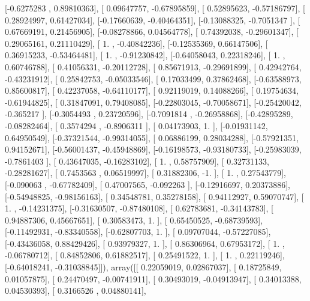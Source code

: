 \documentclass{article}
\begin{document}
       [-0.6275283 ,  0.89810363],
       [ 0.09647757, -0.67895859],
       [ 0.52895623, -0.57186797],
       [ 0.28924997,  0.61427034],
       [-0.17660639, -0.40464351],
       [-0.13088325, -0.7051347 ],
       [ 0.67669191,  0.21456905],
       [-0.08278866,  0.04564778],
       [ 0.74392038, -0.29601347],
       [ 0.29065161,  0.21110429],
       [ 1.        , -0.40842236],
       [-0.12535369,  0.66147506],
       [ 0.36915233, -0.53464481],
       [ 1.        , -0.91230842],
       [-0.64058043,  0.22318246],
       [ 1.        ,  0.60746788],
       [ 0.41056331, -0.20112728],
       [ 0.85671913, -0.29691899],
       [ 0.42942764, -0.43231912],
       [ 0.25842753, -0.05033546],
       [ 0.17033499,  0.37862468],
       [-0.63588973,  0.85600817],
       [ 0.42237058, -0.64110177],
       [ 0.92119019,  0.14088266],
       [ 0.19754634, -0.61944825],
       [ 0.31847091,  0.79408085],
       [-0.22803045, -0.70058671],
       [-0.25420042, -0.365217  ],
       [-0.3054493 ,  0.23720596],
       [-0.7091814 , -0.26958868],
       [-0.42895289, -0.08282464],
       [ 0.3574294 , -0.8906311 ],
       [ 0.04173903,  1.        ],
       [-0.01931142,  0.64950549],
       [-0.37321544, -0.99314055],
       [ 0.06886199,  0.28034288],
       [-0.57921351,  0.94152671],
       [-0.56001437, -0.45948869],
       [-0.16198573, -0.93180733],
       [-0.25983039, -0.7861403 ],
       [ 0.43647035, -0.16283102],
       [ 1.        ,  0.58757909],
       [ 0.32731133, -0.28281627],
       [ 0.7453563 ,  0.06519997],
       [ 0.31882306, -1.        ],
       [ 1.        ,  0.27543779],
       [-0.090063  , -0.67782409],
       [ 0.47007565, -0.092263  ],
       [-0.12916697,  0.20373886],
       [-0.54948825, -0.98156163],
       [ 0.34548781,  0.35278158],
       [ 0.94112927,  0.59070747],
       [ 1.        , -0.14231375],
       [-0.31630507, -0.87480108],
       [ 0.62783681, -0.34143783],
       [ 0.94887306,  0.45667651],
       [ 0.30583473,  1.        ],
       [ 0.65450525, -0.68739593],
       [-0.11492931, -0.83340558],
       [-0.62807703,  1.        ],
       [ 0.09707044, -0.57227085],
       [-0.43436058,  0.88429426],
       [ 0.93979327,  1.        ],
       [ 0.86306964,  0.67953172],
       [ 1.        , -0.06780712],
       [ 0.84852806,  0.61882517],
       [ 0.25491522,  1.        ],
       [ 1.        ,  0.22119246],
       [-0.64018241, -0.31038845]]), array([[ 0.22059019,  0.02867037],
       [ 0.18725849,  0.01057875],
       [ 0.24470497, -0.00741911],
       [ 0.30493019, -0.04913947],
       [ 0.34013388,  0.04530393],
       [ 0.3166526 ,  0.04880141],
\end{document}
